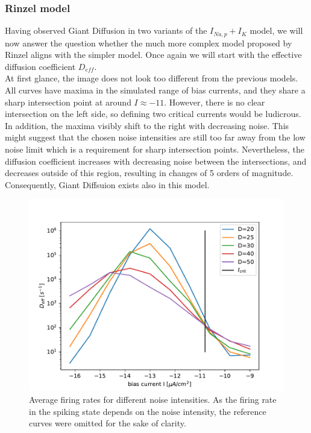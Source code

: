 \documentclass[12pt,a4paper]{article}
\begin{document}
\subsubsection{Rinzel model}
Having observed Giant Diffusion in two variants of the $I_{Na,p}+I_K$ model, we will now answer the question whether the much more complex model proposed by Rinzel aligns with the simpler model. Once again we will start with the effective diffusion coefficient $D_{eff}$.\\
At first glance, the image does not look too different from the previous models. All curves have maxima in the simulated range of bias currents, and they share a sharp intersection point at around $I\approx-11$. However, there is no clear intersection on the left side, so defining two critical currents would be ludicrous. In addition, the maxima visibly shift to the right with decreasing noise. This might suggest that the chosen noise intensities are still too far away from the low noise limit which is a requirement for sharp intersection points. Nevertheless, the diffusion coefficient increases with decreasing noise between the intersections, and decreases outside of this region, resulting in changes of 5 orders of magnitude. Consequently, Giant Diffsuion exists also in this model.
\begin{figure}[H]
	\centering
	\includegraphics[scale=1]{dneursinglecritrealrinzelrangelong26d1realrinzelrange26d1.pdf}\caption{Average firing rates for different noise intensities. As the firing rate in the spiking state depends on the noise intensity, the reference curves were omitted for the sake of clarity.}
	\label{deffrinzel}
\end{figure}
\end{document}
